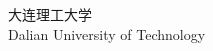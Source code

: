 \begin{center}
    \vfill %
        
    {\huawenxingkai 大连理工大学}\\[10pt]	%
    {\normalsize Dalian University of Technology}\\[20pt]	%
\end{center}

\clearpage  %
\null
\clearpage
